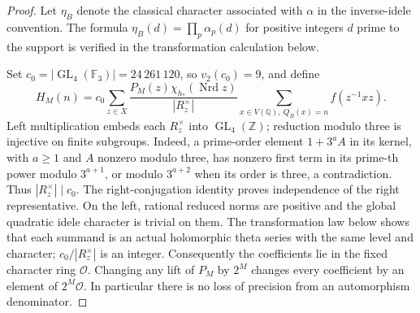 \begin{proof}
Let $\eta_B$ denote the classical character associated with $\alpha$
in the inverse-idele convention.  The formula
$\eta_B(d)=\prod_p\alpha_p(d)$ for positive integers $d$ prime to
the support is verified in the transformation calculation below.

Set $c_0=|\operatorname{GL}_4(\mathbb F_3)|=24\,261\,120$,
so $v_2(c_0)=9$, and define
\[
 H_M(n)=c_0\sum_{z\in X}
 \frac{P_M(z)\chi_{h_*}(\operatorname{Nrd}z)}{|R_z^\times|}
       \sum_{x\in V(\mathbb Q),\ Q_B(x)=n}f(z^{-1}xz). \tag{O.4}
\]
Left multiplication embeds each $R_z^\times$ into
$\operatorname{GL}_4(\mathbb Z)$; reduction modulo three is
injective on finite subgroups.  Indeed, a prime-order element
$1+3^aA$ in its kernel, with $a\geq1$ and $A$ nonzero modulo three,
has nonzero first term in its prime-th power modulo $3^{a+1}$,
or modulo $3^{a+2}$ when its order is three, a contradiction.
Thus $|R_z^\times|\mid c_0$.
The right-conjugation identity proves independence of the right
representative.  On the left, rational reduced norms are positive
and the global quadratic idele character is trivial on them.
The transformation law below shows that each summand is an actual
holomorphic theta series with the same level and character;
$c_0/|R_z^\times|$ is an integer.
Consequently the coefficients lie in the fixed character ring
$\mathcal O$.  Changing any lift of $P_M$ by $2^M$ changes every
coefficient by an element of $2^M\mathcal O$.  In particular
there is no loss of precision from an automorphism denominator.


\end{proof}

